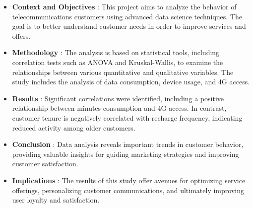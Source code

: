 \begin{itemize}
    \item \textbf{Context and Objectives} : This project aims to analyze the behavior of telecommunications customers using advanced data science techniques. The goal is to better understand customer needs in order to improve services and offers.
    
    \item \textbf{Methodology} : The analysis is based on statistical tools, including correlation tests such as ANOVA and Kruskal-Wallis, to examine the relationships between various quantitative and qualitative variables. The study includes the analysis of data consumption, device usage, and 4G access.
    
    \item \textbf{Results} : Significant correlations were identified, including a positive relationship between minutes consumption and 4G access. In contrast, customer tenure is negatively correlated with recharge frequency, indicating reduced activity among older customers.
    
    \item \textbf{Conclusion} : Data analysis reveals important trends in customer behavior, providing valuable insights for guiding marketing strategies and improving customer satisfaction.
    
    \item \textbf{Implications} : The results of this study offer avenues for optimizing service offerings, personalizing customer communications, and ultimately improving user loyalty and satisfaction.
\end{itemize}


